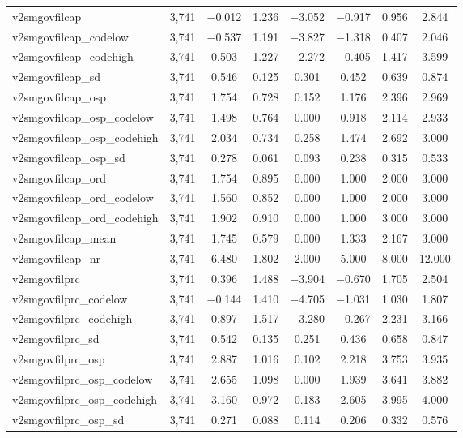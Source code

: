 \begin{table}[!htbp]
\begin{tabular}{@{\extracolsep{5pt}}lccccccc}
v2smgovfilcap & 3,741 & $-$0.012 & 1.236 & $-$3.052 & $-$0.917 & 0.956 & 2.844 \\ 
v2smgovfilcap\_codelow & 3,741 & $-$0.537 & 1.191 & $-$3.827 & $-$1.318 & 0.407 & 2.046 \\ 
v2smgovfilcap\_codehigh & 3,741 & 0.503 & 1.227 & $-$2.272 & $-$0.405 & 1.417 & 3.599 \\ 
v2smgovfilcap\_sd & 3,741 & 0.546 & 0.125 & 0.301 & 0.452 & 0.639 & 0.874 \\ 
v2smgovfilcap\_osp & 3,741 & 1.754 & 0.728 & 0.152 & 1.176 & 2.396 & 2.969 \\ 
v2smgovfilcap\_osp\_codelow & 3,741 & 1.498 & 0.764 & 0.000 & 0.918 & 2.114 & 2.933 \\ 
v2smgovfilcap\_osp\_codehigh & 3,741 & 2.034 & 0.734 & 0.258 & 1.474 & 2.692 & 3.000 \\ 
v2smgovfilcap\_osp\_sd & 3,741 & 0.278 & 0.061 & 0.093 & 0.238 & 0.315 & 0.533 \\ 
v2smgovfilcap\_ord & 3,741 & 1.754 & 0.895 & 0.000 & 1.000 & 2.000 & 3.000 \\ 
v2smgovfilcap\_ord\_codelow & 3,741 & 1.560 & 0.852 & 0.000 & 1.000 & 2.000 & 3.000 \\ 
v2smgovfilcap\_ord\_codehigh & 3,741 & 1.902 & 0.910 & 0.000 & 1.000 & 3.000 & 3.000 \\ 
v2smgovfilcap\_mean & 3,741 & 1.745 & 0.579 & 0.000 & 1.333 & 2.167 & 3.000 \\ 
v2smgovfilcap\_nr & 3,741 & 6.480 & 1.802 & 2.000 & 5.000 & 8.000 & 12.000 \\ 
v2smgovfilprc & 3,741 & 0.396 & 1.488 & $-$3.904 & $-$0.670 & 1.705 & 2.504 \\ 
v2smgovfilprc\_codelow & 3,741 & $-$0.144 & 1.410 & $-$4.705 & $-$1.031 & 1.030 & 1.807 \\ 
v2smgovfilprc\_codehigh & 3,741 & 0.897 & 1.517 & $-$3.280 & $-$0.267 & 2.231 & 3.166 \\ 
v2smgovfilprc\_sd & 3,741 & 0.542 & 0.135 & 0.251 & 0.436 & 0.658 & 0.847 \\ 
v2smgovfilprc\_osp & 3,741 & 2.887 & 1.016 & 0.102 & 2.218 & 3.753 & 3.935 \\ 
v2smgovfilprc\_osp\_codelow & 3,741 & 2.655 & 1.098 & 0.000 & 1.939 & 3.641 & 3.882 \\ 
v2smgovfilprc\_osp\_codehigh & 3,741 & 3.160 & 0.972 & 0.183 & 2.605 & 3.995 & 4.000 \\ 
v2smgovfilprc\_osp\_sd & 3,741 & 0.271 & 0.088 & 0.114 & 0.206 & 0.332 & 0.576 \\ 

\end{tabular}
\end{table}
